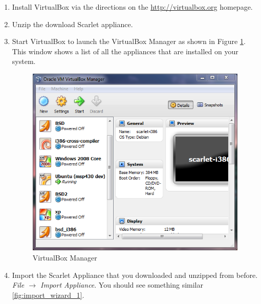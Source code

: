 \documentclass[pdftex,11pt,letterpaper]{article}
\begin{document}
\begin{enumerate}
  \item Install VirtualBox via the directions on the \url{http://virtualbox.org} homepage.
\item Unzip the download Scarlet appliance.
\item Start VirtualBox to launch the VirtualBox Manager as shown in Figure \ref{fig:virtualbox_manager}.  This window shows a list of all the appliances that are installed on your system.

  \begin{figure}[H]
    \begin{center}
      \leavevmode
      \includegraphics[]{scarlet_images/virtual_box.png}
    \end{center}
    \caption{VirtualBox Manager}
    \label{fig:virtualbox_manager}
  \end{figure}

\item Import the Scarlet Appliance that you downloaded and unzipped from before.  \textit{File $\rightarrow$ Import Appliance}.  You should see something similar \ref{fig:import_wizard_1}.


\end{enumerate}
\end{document}

